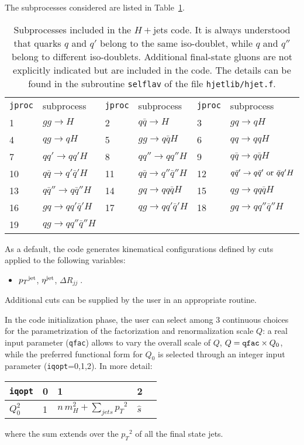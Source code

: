 \documentclass[paper]{JHEP3}
\newcommand{\ccaption}[2]{
    \begin{center}
    \parbox{0.85\textwidth}{
      \caption[#1]{\small{{#2}}}
      }
    \end{center}
    }
\def    \qbar   {\bar{q}}
\def    \pt             {\mbox{$p_T$}}
\begin{document}
The subprocesses considered are listed in Table~\ref{tab:hjets}.
\begin{table}
\begin{center}
\begin{tabular}{ll|ll|ll}
{\tt jproc} & subprocess & {\tt jproc} & subprocess & {\tt jproc} &
subprocess \\ 
1  &  $g g    \to   H$ 
&2 &  $q\qbar \to   H$ 
&3 &  $g q    \to q H$ 
\\
4  &  $q g    \to q H$ 
&5 &  $gg     \to q \qbar H$ 
&6 &  $qq     \to q q     H$ 
\\
 7 &  $q q'  \to  q q'      H$ 
&8 &  $q q'' \to  q q''     H$ 
&9 &  $q \qbar \to   q \qbar     H$ 
\\
 10 &  $q \qbar \to   q' \qbar'   H$ 
&11 &  $q \qbar \to   q'' \qbar'' H$ 
&12 &   $q \qbar'  \to   q \qbar' {\rm~or~} \qbar q' H$ 
\\
 13 &  $q \qbar'' \to   q \qbar''                   H$ 
&14 &  $g q  \to q q \qbar H$ 
&15 &  $q g  \to q q \qbar H$ 
\\
 16 &   $g q  \to q q' \qbar'   H$ 
&17 &  $q g  \to q q' \qbar'   H$ 
&18 &  $g q  \to q q'' \qbar'' H$ 
\\
19 & $q g  \to q q'' \qbar'' H$ 
& &
& &
\end{tabular}
\ccaption{}{\label{tab:hjets} Subprocesses included in the $H+$jets
  code. It is always understood that quarks $q$ and $q'$ belong to the same
iso-doublet, while $q$ and $q''$ belong to different iso-doublets.
  Additional final-state
  gluons are not explicitly indicated but are included in the
  code. 
  The details can be found in the subroutine {\tt selflav} of
  the file {\tt hjetlib/hjet.f}.}
\end{center}
\end{table}

As a default, the code generates kinematical configurations defined by
cuts applied to the following variables:
\begin{itemize}
\item $\pt^{\rm jet}$, $\eta^{\rm jet}$, $\Delta R_{jj} \; .$
\end{itemize}
Additional cuts can be supplied by the user in an appropriate
routine. 

In the code initialization phase, the user can select among 3
continuous choices for the parametrization of the factorization and
renormalization scale $Q$: a real input parameter ({\tt qfac}) allows
to vary the overall scale of $Q$, $Q={\tt qfac}\times Q_0$, while the
preferred functional form for $Q_0$ is selected through an integer
input parameter ({\tt iqopt}=0,1,2).  In more detail:
{\renewcommand{\arraystretch}{1.2}
\begin{center}
\begin{tabular}{l||l|l|l|l|}
{\tt iqopt} & 0 & 1 & 2 \\  \hline
$Q_0^2$ & 1 & $n\,m_H^2+\sum_{jets}\pt^2$ & ${\hat{s}}$ 
\end{tabular}
\end{center}
}
where the sum extends over the $\pt^2$ of all the final state jets.
\end{document}
